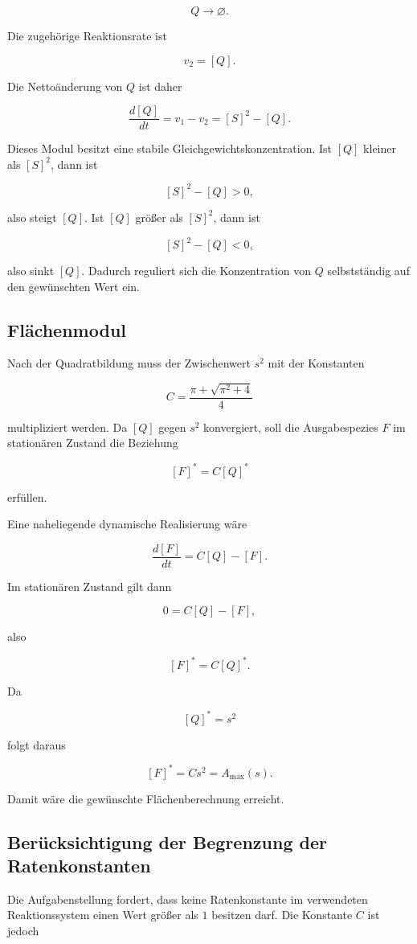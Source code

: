 \[
Q \longrightarrow \varnothing.
\]

Die zugehörige Reaktionsrate ist

\[
v_2=[Q].
\]

Die Nettoänderung von \(Q\) ist daher

\[
\frac{d[Q]}{dt}=v_1-v_2=[S]^2-[Q].
\]

Dieses Modul besitzt eine stabile Gleichgewichtskonzentration. Ist
\([Q]\) kleiner als \([S]^2\), dann ist

\[
[S]^2-[Q]>0,
\]

also steigt \([Q]\). Ist \([Q]\) größer als \([S]^2\), dann ist

\[
[S]^2-[Q]<0,
\]

also sinkt \([Q]\). Dadurch reguliert sich die Konzentration von \(Q\)
selbstständig auf den gewünschten Wert ein.

\subsection{Flächenmodul}

Nach der Quadratbildung muss der Zwischenwert \(s^2\) mit der Konstanten

\[
C=
\frac{\pi+\sqrt{\pi^2+4}}{4}
\]

multipliziert werden. Da \([Q]\) gegen \(s^2\) konvergiert, soll die
Ausgabespezies \(F\) im stationären Zustand die Beziehung

\[
[F]^*=C[Q]^*
\]

erfüllen.

Eine naheliegende dynamische Realisierung wäre

\[
\frac{d[F]}{dt}
=
C[Q]-[F].
\]

Im stationären Zustand gilt dann

\[
0=C[Q]-[F],
\]

also

\[
[F]^*=C[Q]^*.
\]

Da

\[
[Q]^*=s^2
\]

folgt daraus

\[
[F]^*=Cs^2=A_{\max}(s).
\]

Damit wäre die gewünschte Flächenberechnung erreicht.

\subsection{Berücksichtigung der Begrenzung der Ratenkonstanten}

Die Aufgabenstellung fordert, dass keine Ratenkonstante im verwendeten
Reaktionssystem einen Wert größer als \(1\) besitzen darf. Die Konstante
\(C\) ist jedoch

